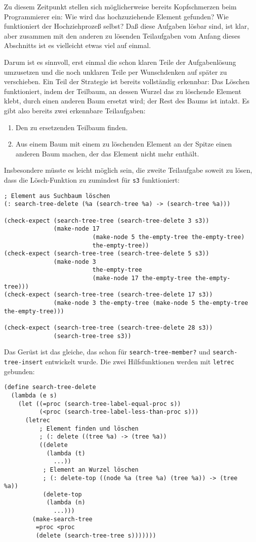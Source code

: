Zu diesem Zeitpunkt stellen sich möglicherweise bereits Kopfschmerzen
beim Programmierer ein: Wie wird das hochzuziehende Element gefunden?
Wie funktioniert der Hochziehprozeß selbst?  Daß diese Aufgaben lösbar
sind, ist klar, aber zusammen mit den anderen zu lösenden Teilaufgaben
vom Anfang dieses Abschnitts ist es vielleicht etwas viel auf einmal.

Darum ist es sinnvoll, erst einmal die schon klaren Teile der
Aufgabenlösung umzusetzen und die noch unklaren Teile per Wunschdenken
auf später zu verschieben.  Ein Teil der Strategie ist bereits
vollständig erkennbar: Das Löschen funktioniert, indem der Teilbaum,
an dessen Wurzel das zu löschende Element klebt, durch einen anderen
Baum ersetzt wird; der Rest des Baums ist intakt.  Es gibt also
bereits zwei erkennbare Teilaufgaben:
%
\begin{enumerate}
\item Den zu ersetzenden Teilbaum finden.
\item Aus einem Baum mit einem zu löschenden Element an der Spitze
  einen anderen Baum machen, der das Element nicht mehr enthält.
\end{enumerate}
%
Insbesondere müsste es leicht möglich sein, die zweite Teilaufgabe
soweit zu lösen, dass die Lösch-Funktion zu zumindest für \texttt{s3}
funktioniert:
%
\begin{verbatim}
; Element aus Suchbaum löschen
(: search-tree-delete (%a (search-tree %a) -> (search-tree %a)))

(check-expect (search-tree-tree (search-tree-delete 3 s3))
              (make-node 17
                         (make-node 5 the-empty-tree the-empty-tree)
                         the-empty-tree))
(check-expect (search-tree-tree (search-tree-delete 5 s3))
              (make-node 3
                         the-empty-tree
                         (make-node 17 the-empty-tree the-empty-tree)))
(check-expect (search-tree-tree (search-tree-delete 17 s3))
              (make-node 3 the-empty-tree (make-node 5 the-empty-tree the-empty-tree)))

(check-expect (search-tree-tree (search-tree-delete 28 s3))
              (search-tree-tree s3))
\end{verbatim}
%
Das Gerüst ist das gleiche, das schon für \texttt{search-tree-member?}
und \texttt{search-tree-insert} entwickelt wurde.  Die zwei
Hilfsfunktionen werden mit \texttt{letrec} gebunden:
%
\begin{verbatim}
(define search-tree-delete
  (lambda (e s)
    (let ((=proc (search-tree-label-equal-proc s))
          (<proc (search-tree-label-less-than-proc s)))
      (letrec
          ; Element finden und löschen
          ; (: delete ((tree %a) -> (tree %a))
          ((delete
            (lambda (t)
              ...))
           ; Element an Wurzel löschen
           ; (: delete-top ((node %a (tree %a) (tree %a)) -> (tree %a))
           (delete-top
            (lambda (n)
              ...)))
        (make-search-tree
         =proc <proc
         (delete (search-tree-tree s)))))))
\end{verbatim}
